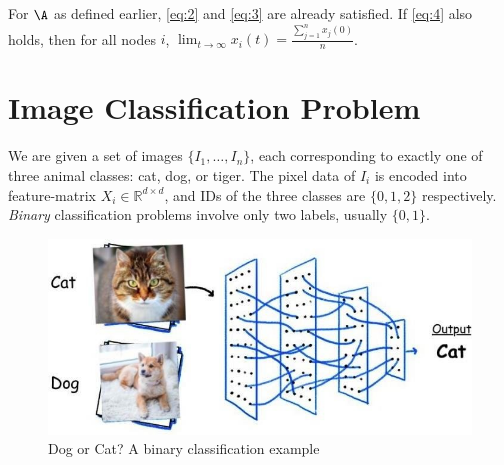 \documentclass[12pt]{article}
\begin{document}
\noindent For $\A$ as defined earlier, \eqref{eq:2} and \eqref{eq:3} are already satisfied. If \eqref{eq:4} also holds, then for all nodes $i$, $\lim_{t\to \infty} x_i(t) = \frac{\sum_{j=1}^{n} x_j(0)}{n}$.


%
%
%


\section{Image Classification Problem}


We are given a set of images $\{I_1, \dots, I_n\}$, each corresponding to exactly one of three animal classes: cat, dog, or tiger. The pixel data of $I_i$ is encoded into feature-matrix $X_i \in \mathbb{R}^{d\times d}$, and IDs of the three classes are $\{0,1,2\}$ respectively. \textit{Binary} classification problems involve only two labels, usually $\{0,1\}$.
\\
\begin{figure}[h]

\centering
\includegraphics[scale=0.5]{classification.png}
\caption{Dog or Cat? A binary classification example}
\end{figure}
\end{document}
